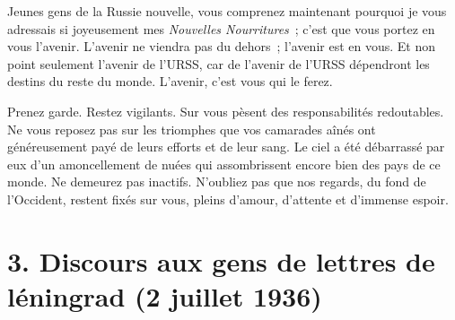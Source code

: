 \documentclass[french,twoside]{book} %
\begin{document}
Jeunes gens de la Russie nouvelle, vous comprenez maintenant pourquoi je vous adressais si joyeusement mes \emph{Nouvelles Nourritures} ; c’est que vous portez en vous l’avenir. L’avenir ne viendra pas du dehors ; l’avenir est en vous. Et non point seulement l’avenir de l’URSS, car de l’avenir de l’URSS dépendront les destins du reste du monde. L’avenir, c’est vous qui le ferez.\par
Prenez garde. Restez vigilants. Sur vous pèsent des responsabilités redoutables. Ne vous reposez pas sur les triomphes que vos camarades aînés ont généreusement payé de leurs efforts et de leur sang. Le ciel a été débarrassé par eux d’un amoncellement de nuées qui assombrissent encore bien des pays de ce monde. Ne demeurez pas inactifs. N’oubliez pas que nos regards, du fond de l’Occident, restent fixés sur vous, pleins d’amour, d’attente et d’immense espoir.

\section[{3. Discours aux gens de lettres de léningrad (2 juillet 1936)}]{3. Discours aux gens de lettres de léningrad (2 juillet 1936)}
\end{document}
